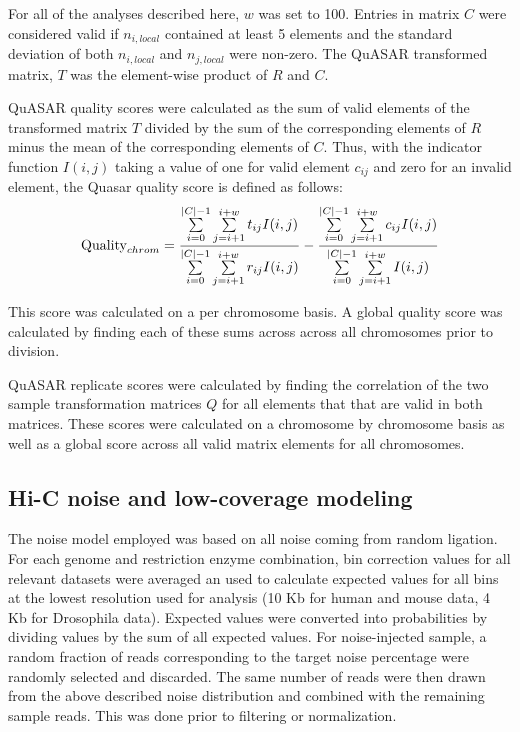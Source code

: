 For all of the analyses described here, $w$ was set to 100. Entries in matrix $C$ were considered valid if $n_{i,local}$ contained at least 5 elements and the standard deviation of both $n_{i,local}$ and $n_{j,local}$ were non-zero. The QuASAR transformed matrix, $T$ was the element-wise product of $R$ and $C$.

QuASAR quality scores were calculated as the sum of valid elements of the transformed matrix $T$ divided by the sum of the corresponding elements of $R$ minus the mean of the corresponding elements of $C$. Thus, with the indicator function $I(i,j)$ taking a value of one for valid element $c_{ij}$ and zero for an invalid element, the Quasar quality score is defined as follows:
\[\textnormal{Quality}_{chrom}=\frac{\sum\limits_{i=0}^{|C|-1}\sum\limits_{j=i+1}^{i+w}t_{ij}I(i,j)}{\sum\limits_{i=0}^{|C|-1}\sum\limits_{j=i+1}^{i+w}r_{ij}I(i,j)}-\frac{\sum\limits_{i=0}^{|C|-1}\sum\limits_{j=i+1}^{i+w}c_{ij}I(i,j)}{\sum\limits_{i=0}^{|C|-1}\sum\limits_{j=i+1}^{i+w}I(i,j)}\]

This score was calculated on a per chromosome basis. A global quality score was calculated by finding each of these sums across across all chromosomes prior to division.

QuASAR replicate scores were calculated by finding the correlation of the two sample transformation matrices $Q$ for all elements that that are valid in both matrices. These scores were calculated on a chromosome by chromosome basis as well as a global score across all valid matrix elements for all chromosomes.

\subsection{Hi-C noise and low-coverage modeling}

The noise model employed was based on all noise coming from random ligation. For each genome and restriction enzyme combination, bin correction values for all relevant datasets were averaged an used to calculate expected values for all bins at the lowest resolution used for analysis (10 Kb for human and mouse data, 4 Kb for Drosophila data). Expected values were converted into probabilities by dividing values by the sum of all expected values. For noise-injected sample, a random fraction of reads corresponding to the target noise percentage were randomly selected and discarded. The same number of reads were then drawn from the above described noise distribution and combined with the remaining sample reads. This was done prior to filtering or normalization.

